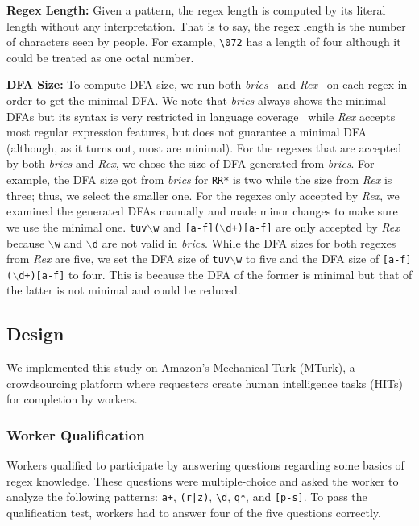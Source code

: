 \textbf{Regex Length:} 
Given a pattern, the regex length is computed by its literal length without any interpretation. That is to say, the regex length is the number of characters seen by people. For example, \verb!\072! has a length of four although it could be treated as one octal number.

\textbf{DFA Size:} 
To compute DFA size, we run both \textit{brics}~\cite{brics} and \textit{Rex}~\cite{rex} on each regex in order to get the minimal DFA. We note that \textit{brics} always shows the minimal DFAs but its syntax is very restricted in language coverage~\cite{chapman2016} while \textit{Rex} accepts most regular expression features, but does not guarantee a minimal DFA (although, as it turns out, most are minimal). %
For the regexes that are accepted by both \textit{brics} and \textit{Rex}, we chose the size of DFA generated from \textit{brics}. For example, the DFA size got from \textit{brics} for {\tt RR*} is two while the size  from \textit{Rex} is three; thus, we select the smaller one.
For the regexes only accepted by \textit{Rex}, we examined the generated DFAs manually and made minor changes to make sure we use the minimal one. {\tt tuv$\backslash$w} and {\tt [a-f]($\backslash$d+)[a-f]} are only accepted by \textit{Rex} because {\tt $\backslash$w} and {\tt $\backslash$d} are not valid in \textit{brics}. While the DFA sizes for both regexes from \textit{Rex} are five, we set the DFA size of {\tt tuv$\backslash$w} to five and the DFA size of {\tt [a-f]($\backslash$d+)[a-f]} to four. This is because the DFA of the former is minimal but that of the latter is not minimal and could be reduced.

\subsection{Design}
We implemented this study on  Amazon's Mechanical Turk (MTurk),  a crowdsourcing platform where requesters create human intelligence tasks (HITs) for completion by workers.

\subsubsection{Worker Qualification}
Workers qualified to participate  by answering questions regarding some basics of regex knowledge. These questions were multiple-choice and asked the worker to analyze the following patterns: \verb!a+!, \verb!(r|z)!, \verb!\d!, \verb!q*!, and \verb![p-s]!. To pass the qualification test, workers had to answer four of the five questions correctly.

